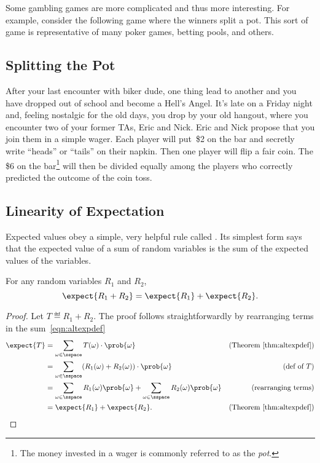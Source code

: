 Some gambling games are more complicated and thus more interesting.
For example, consider the following game where the winners split a
pot.  This sort of game is representative of many poker games, betting
pools, and others.

\subsection{Splitting the Pot}

After your last encounter with biker dude, one thing lead to another
and you have dropped out of school and become a Hell's Angel.  It's
late on a Friday night and, feeling nostalgic for the old days, you
drop by your old hangout, where you encounter two of your former TAs,
Eric and Nick.  Eric and Nick propose that you join them in a simple
wager. Each player will put~\$2 on the bar and secretly write
``heads'' or ``tails'' on their napkin.  Then one player will flip a
fair coin.   The \$6 on the bar\footnote{The money invested in a wager
  is commonly referred to as the \emph{pot}.} will then be divided
equally among the players who correctly predicted the outcome of the
coin toss.



\subsection{Linearity of Expectation}\label{finlin}

Expected values obey a simple, very helpful rule called
.  Its simplest form says that the
expected value of a sum of random variables is the sum of the expected
values of the variables.

\begin{theorem}\label{expsum-2}
For any random variables $R_1$ and $R_2$,
\[
\expect{R_1 + R_2} = \expect{R_1} + \expect{R_2}.
\]
\end{theorem}

\begin{proof}
Let $T \eqdef R_1+R_2$.  The proof follows straightforwardly by
rearranging terms in the sum~\eqref{eqn:altexpdef}
\begin{align*}
\expect{T} & = \sum_{\omega \in \sspace} T(\omega) \cdot \prob{\omega}
                & \text{(Theorem~\ref{thm:altexpdef})}\\
        & = \sum_{\omega \in \sspace} (R_1(\omega) + R_2(\omega)) \cdot \prob{\omega}
                         & \text{(def of $T$)}\\
        & = \sum_{\omega \in \sspace} R_1(\omega) \prob{\omega} +
              \sum_{\omega \in \sspace} R_2(\omega) \prob{\omega} & \text{(rearranging terms)}\\
        & = \expect{R_1} + \expect{R_2}.   & \text{(Theorem~\ref{thm:altexpdef})}
\end{align*}
\end{proof}

